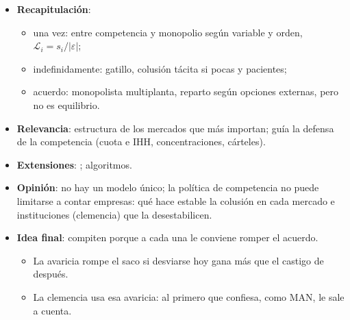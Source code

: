 \documentclass{article}
\begin{document}
\begin{columnas}
\begin{itemize}
\item \textbf{Recapitulación}:
  \begin{itemize}
  \item una vez: entre competencia y monopolio según variable y orden, $\mathcal{L}_i=s_i/|\varepsilon|$;
  \item indefinidamente: gatillo, colusión tácita si pocas y pacientes;
  \item acuerdo: monopolista multiplanta, reparto según opciones externas, pero no es equilibrio.
  \end{itemize}
\item \textbf{Relevancia}: estructura de los mercados que más importan; guía la defensa de la competencia (cuota e IHH, concentraciones, cárteles).
\item \textbf{Extensiones}:        ; algoritmos.
\item \textbf{Opinión}: no hay un modelo único; la política de competencia no puede limitarse a contar empresas: qué hace estable la colusión en cada mercado e instituciones (clemencia) que la desestabilicen.
\item \textbf{Idea final}: compiten porque a cada una le conviene romper el acuerdo.
  \begin{itemize}
  \item La avaricia rompe el saco si desviarse hoy gana más que el castigo de después.
  \item La clemencia usa esa avaricia: al primero que confiesa, como MAN, le sale a cuenta.
  \end{itemize}
\end{itemize}


\end{columnas}
\end{document}
